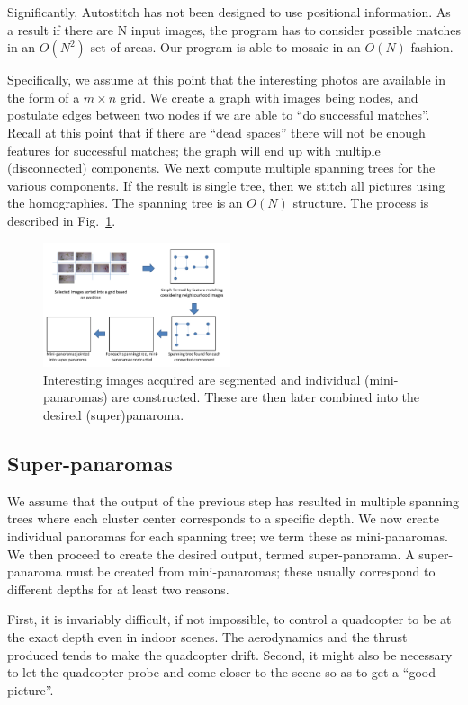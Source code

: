 \documentclass[10pt,twocolumn,letterpaper]{article}
\begin{document}
Significantly, Autostitch has not been designed to use positional
information. As a result if there are N input images, the program has
to consider possible matches in an $O(N^2)$ set of areas.  Our program
is able to mosaic in an $O(N)$ fashion.
 
Specifically, we assume at this point that the interesting photos are
available in the form of a $m \times n$ grid. We create a graph with
images being nodes, and postulate edges between two nodes if we are
able to ``do successful matches''. Recall at this point that if there
are ``dead spaces'' there will not be enough features for successful
matches; the graph will end up with multiple (disconnected)
components.  We next compute multiple spanning trees for the various
components. If the result is single tree, then we stitch all pictures
using the homographies.  The spanning tree is an $O(N)$ structure. The
process is described in Fig.~\ref{fig:graph}.

\begin{figure}[h!]
  \centering
  \includegraphics[width=0.49\textwidth]{figures/graph} 
  \caption{ \label{fig:graph} Interesting images acquired are
    segmented and individual (mini-panaromas) are constructed. These
    are then later combined into the desired (super)panaroma.  }
\end{figure}    

\subsection{Super-panaromas}
We assume that the output of the previous step has resulted in
multiple spanning trees where each cluster center corresponds to a
specific depth. We now create individual panoramas for each spanning
tree; we term these as mini-panaromas. We then proceed to create the
desired output, termed super-panorama.  A super-panaroma must be
created from mini-panaromas; these usually correspond to different
depths for at least two reasons.

First, it is invariably difficult, if not impossible, to control a
quadcopter to be at the exact depth even in indoor scenes.  The
aerodynamics and the thrust produced tends to make the quadcopter
drift.  Second, it might also be necessary to let the quadcopter probe
and come closer to the scene so as to get a ``good picture''.
\end{document}
